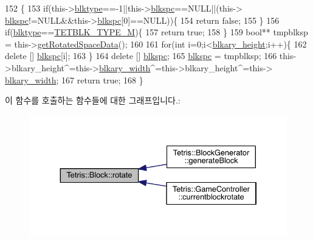 \begin{DoxyCode}
152                   \{
153                 \textcolor{keywordflow}{if}(this->\hyperlink{class_tetris_1_1_block_aceac58dcf8d8afaa82c2bab101cb3cff}{blktype}==-1||this->\hyperlink{class_tetris_1_1_block_af2f96c83a3511d32321672f794aa4db1}{blkspc}==NULL||(this->
      \hyperlink{class_tetris_1_1_block_af2f96c83a3511d32321672f794aa4db1}{blkspc}!=NULL&&this->\hyperlink{class_tetris_1_1_block_af2f96c83a3511d32321672f794aa4db1}{blkspc}[0]==NULL))\{
154                     \textcolor{keywordflow}{return} \textcolor{keyword}{false};
155                 \}
156                 \textcolor{keywordflow}{if}(\hyperlink{class_tetris_1_1_block_aceac58dcf8d8afaa82c2bab101cb3cff}{blktype}==\hyperlink{_block_8h_a6da1e2b8848e1a7b5a7ee687fd6492bd}{TETBLK\_TYPE\_M})\{
157                     \textcolor{keywordflow}{return} \textcolor{keyword}{true};
158                 \}
159                 \textcolor{keywordtype}{bool}** tmpblksp = this->\hyperlink{class_tetris_1_1_block_a464ed776185993ad827f316a08969960}{getRotatedSpaceData}();
160 
161                 \textcolor{keywordflow}{for}(\textcolor{keywordtype}{int} i=0;i<\hyperlink{class_tetris_1_1_block_abbea7737c2b1fb7339aab4dff13de27c}{blkary\_height};i++)\{
162                     \textcolor{keyword}{delete} [] \hyperlink{class_tetris_1_1_block_af2f96c83a3511d32321672f794aa4db1}{blkspc}[i];
163                 \}
164                 \textcolor{keyword}{delete} [] \hyperlink{class_tetris_1_1_block_af2f96c83a3511d32321672f794aa4db1}{blkspc};
165                 \hyperlink{class_tetris_1_1_block_af2f96c83a3511d32321672f794aa4db1}{blkspc} = tmpblksp;
166                 this->blkary\_height^=this->\hyperlink{class_tetris_1_1_block_a96548cab58eb788af744b54192c7bea1}{blkary\_width}^=this->blkary\_height^=this->
      \hyperlink{class_tetris_1_1_block_a96548cab58eb788af744b54192c7bea1}{blkary\_width};
167                 \textcolor{keywordflow}{return} \textcolor{keyword}{true};
168             \}
\end{DoxyCode}
이 함수를 호출하는 함수들에 대한 그래프입니다.\+:
\nopagebreak
\begin{figure}[H]
\begin{center}
\leavevmode
\includegraphics[width=334pt]{df/d05/class_tetris_1_1_block_a0d1eb57e6da91832ad983f7a4fa9ca04_icgraph}
\end{center}
\end{figure}
\mbox{\label{class_tetris_1_1_block_a0d1eb57e6da91832ad983f7a4fa9ca04}} 
